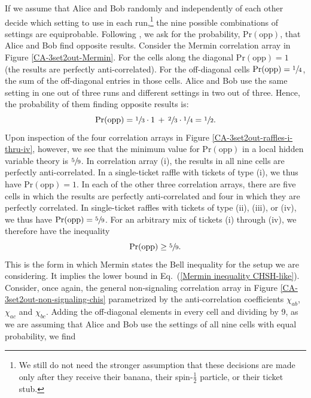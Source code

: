 If we assume that Alice and Bob randomly and independently of each other decide which setting to use in each run,\footnote{We still do not need the stronger assumption that these decisions are made only after they receive their banana, their spin-$\frac12$ particle, or their ticket stub.} the nine possible combinations of settings are equiprobable. Following \citet[pp.\ 86--87]{Mermin 1981}, we ask for the probability, $\mathrm{Pr(opp)}$, that Alice and Bob find opposite results. Consider the Mermin correlation array in Figure \ref{CA-3set2out-Mermin}. For the cells along the diagonal $\mathrm{Pr(opp)} = 1$ (the results are perfectly anti-correlated). For the off-diagonal cells $\mathrm{Pr(opp)} = \sfrac14$, the sum of the off-diagonal entries in those cells. Alice and Bob use the same setting in one out of three runs and different settings in two out of three. Hence, the probability of them finding opposite results is:
\begin{equation}
\mathrm{Pr(opp)} = \sfrac13 \cdot 1 \, + \, \sfrac23 \cdot \sfrac14 = \sfrac12.
\label{Pr opp Mermin}
\end{equation}
Upon inspection of the four correlation arrays in Figure \ref{CA-3set2out-raffles-i-thru-iv}, however, we see that the minimum value for $\mathrm{Pr(opp)}$ in a local hidden variable theory is $\sfrac59$. In correlation array (i), the results in all nine cells are perfectly anti-correlated. In a single-ticket raffle with tickets of type (i), we thus have $\mathrm{Pr(opp)} = 1$.  In each of the other three correlation arrays, there are five cells in which the results are perfectly anti-correlated and four in which they are perfectly correlated. In single-ticket raffles with tickets of type (ii), (iii), or (iv), we thus have $\mathrm{Pr(opp)} = \sfrac59$. For an arbitrary mix of tickets (i) through (iv), we therefore have the inequality
\begin{equation}
\mathrm{Pr(opp)} \ge \sfrac59.
\label{Mermin inequality probs}
\end{equation}
This is the form in which Mermin states the Bell inequality for the setup we are considering. It implies the lower bound in Eq.\ (\ref{Mermin inequality CHSH-like}). Consider, once again, the general non-signaling correlation array in Figure \ref{CA-3set2out-non-signaling-chis} parametrized by the anti-correlation coefficients $\chi_{ab}$, $\chi_{ac}$ and  $\chi_{bc}$. Adding the off-diagonal elements in every cell and dividing by 9, as we are assuming that Alice and Bob use the settings of all nine cells with equal probability, we find
